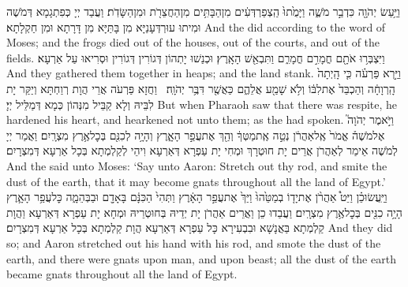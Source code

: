 {וַיַּ֥עַשׂ יְהֹוָ֖ה כִּדְבַ֣ר מֹשֶׁ֑ה וַיָּמֻ֙תוּ֙ הַֽצְפַרְדְּעִ֔ים מִן\maqqaf הַבָּתִּ֥ים מִן\maqqaf הַחֲצֵרֹ֖ת וּמִן\maqqaf הַשָּׂדֹֽת׃}
{וַעֲבַד יְיָ כְּפִתְגָמָא דְּמֹשֶׁה וּמִיתוּ עוּרְדְּעָנַיָּא מִן בָּתַּיָּא מִן דָּרָתָא וּמִן חַקְלָתָא׃}
{And the \lord\space did according to the word of Moses; and the frogs died out of the houses, out of the courts, and out of the fields.}{}
{וַיִּצְבְּר֥וּ אֹתָ֖ם חֳמָרִ֣ם חֳמָרִ֑ם וַתִּבְאַ֖שׁ הָאָֽרֶץ׃}
{וּכְנַשׁוּ יָתְהוֹן דְּגוֹרִין דְּגוֹרִין וּסְרִיאוּ עַל אַרְעָא׃}
{And they gathered them together in heaps; and the land stank.}{}
{וַיַּ֣רְא פַּרְעֹ֗ה כִּ֤י הָֽיְתָה֙ הָֽרְוָחָ֔ה וְהַכְבֵּד֙ אֶת\maqqaf לִבּ֔וֹ וְלֹ֥א שָׁמַ֖ע אֲלֵהֶ֑ם כַּאֲשֶׁ֖ר דִּבֶּ֥ר יְהֹוָֽה׃ \setuma }
{וַחֲזָא פַּרְעֹה אֲרֵי הֲוָת רְוַחְתָּא וְיַקַּר יָת לִבֵּיהּ וְלָא קַבֵּיל מִנְּהוֹן כְּמָא דְּמַלֵּיל יְיָ׃}
{But when Pharaoh saw that there was respite, he hardened his heart, and hearkened not unto them; as the \lord\space had spoken.}{}
{וַיֹּ֣אמֶר יְהֹוָה֮ אֶל\maqqaf מֹשֶׁה֒ אֱמֹר֙ אֶֽל\maqqaf אַהֲרֹ֔ן נְטֵ֣ה אֶֽת\maqqaf מַטְּךָ֔ וְהַ֖ךְ אֶת\maqqaf עֲפַ֣ר הָאָ֑רֶץ וְהָיָ֥ה לְכִנִּ֖ם בְּכׇל\maqqaf אֶ֥רֶץ מִצְרָֽיִם׃}
{וַאֲמַר יְיָ לְמֹשֶׁה אֵימַר לְאַהֲרֹן אֲרֵים יָת חוּטְרָךְ וּמְחִי יָת עַפְרָא דְּאַרְעָא וִיהֵי לְקַלְמְתָא בְּכָל אַרְעָא דְּמִצְרָיִם׃}
{And the \lord\space said unto Moses: ‘Say unto Aaron: Stretch out thy rod, and smite the dust of the earth, that it may become gnats throughout all the land of Egypt.’}{}
{וַיַּֽעֲשׂוּ\maqqaf כֵ֗ן וַיֵּט֩ אַהֲרֹ֨ן אֶת\maqqaf יָד֤וֹ בְמַטֵּ֙הוּ֙ וַיַּךְ֙ אֶת\maqqaf עֲפַ֣ר הָאָ֔רֶץ וַתְּהִי֙ הַכִּנָּ֔ם בָּאָדָ֖ם וּבַבְּהֵמָ֑ה כׇּל\maqqaf עֲפַ֥ר הָאָ֛רֶץ הָיָ֥ה כִנִּ֖ים בְּכׇל\maqqaf אֶ֥רֶץ מִצְרָֽיִם׃}
{וַעֲבַדוּ כֵן וַאֲרֵים אַהֲרֹן יָת יְדֵיהּ בְּחוּטְרֵיהּ וּמְחָא יָת עַפְרָא דְּאַרְעָא וַהֲוָת קַלְמְתָא בַּאֲנָשָׁא וּבִבְעִירָא כָּל עַפְרָא דְּאַרְעָא הֲוָת קַלְמְתָא בְּכָל אַרְעָא דְּמִצְרָיִם׃}
{And they did so; and Aaron stretched out his hand with his rod, and smote the dust of the earth, and there were gnats upon man, and upon beast; all the dust of the earth became gnats throughout all the land of Egypt.}{}

